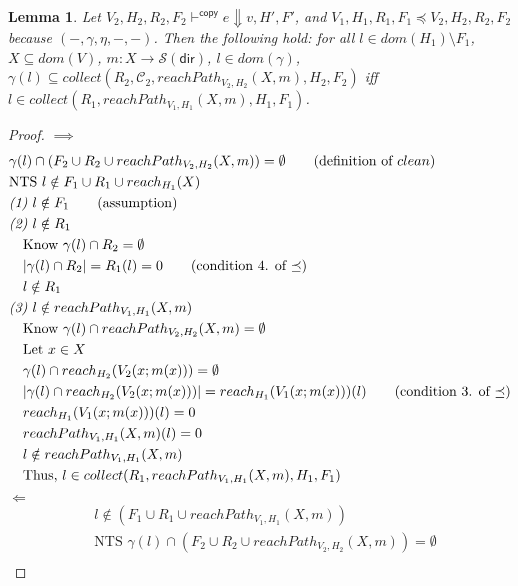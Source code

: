 \documentclass{easychair}
\newcommand{\ms}[1]{\ensuremath{\mathsf{#1}}}
\newtheorem{lemma}[theorem]{Lemma}
\theoremstyle{definition}
\begin{document}
\begin{lemma}
Let $V_2,H_2,R_2,F_2 \vdash^{\mathsf{copy}} e \Downarrow v,H',F'$, and 
$V_1,H_1,R_1,F_1 \preceq V_2,H_2,R_2,F_2$ because $(-,\gamma,\eta,-,-)$. Then the following hold:
for all $l \in dom(H_1) \setminus F_1$, 
	$X \subseteq dom(V)$, $m : X \to \mathcal{S}(\ms{dir})$, $l \in dom(\gamma)$,
	$\gamma(l) \subseteq collect(R_2,\mathcal{C}_2,reachPath_{V_2,H_2}(X,m),H_2,F_2)$ iff
	$l \in collect(R_1,reachPath_{V_1,H_1}(X,m),H_1,F_1)$.
\end{lemma}

\begin{proof}
	$\implies$
	\begin{align*}
		&\gamma(l) \cap (F_2 \cup R_2 \cup reachPath_{V_2,H_2}(X,m)) = 
			\emptyset \tag{definition of $clean$}\\
		&\text{NTS } l \notin F_1 \cup R_1 \cup reach_{H_1}(X)\\
		&\emph{(1) } l \notin F_1 \tag{assumption}\\
		&\emph{(2) } l \notin R_1\\
		&\quad \text{Know } \gamma(l) \cap R_2 = \emptyset\\
		&\quad |\gamma(l) \cap R_2| = R_1(l) = 0 \tag{condition 4. of $\preceq$}\\
		&\quad l \notin R_1\\
		&\emph{(3) } l \notin reachPath_{V_1,H_1}(X,m)\\
		&\quad \text{Know } \gamma(l) \cap reachPath_{V_2,H_2}(X,m) = \emptyset\\
		&\quad \text{Let } x \in X\\
		&\quad \gamma(l) \cap reach_{H_2}(V_2(x;m(x))) = \emptyset\\
		&\quad |\gamma(l) \cap reach_{H_2}(V_2(x;m(x)))| = reach_{H_1}(V_1(x;m(x)))(l) 
			\tag{condition 3. of $\preceq$}\\
		&\quad reach_{H_1}(V_1(x;m(x)))(l) = 0\\
		&\quad reachPath_{V_1,H_1}(X,m)(l) = 0\\
		&\quad l \notin reachPath_{V_1,H_1}(X,m)\\
		&\quad \text{Thus, } l \in collect(R_1,reachPath_{V_1,H_1}(X,m),H_1,F_1)
	\end{align*}
	$\Longleftarrow$
	\begin{align*}
		&l \notin (F_1 \cup R_1 \cup reachPath_{V_1,H_1}(X,m))\\
		&\text{NTS } \gamma(l) \cap (F_2 \cup R_2 \cup reachPath_{V_2,H_2}(X,m)) = \emptyset\\

\end{align*}
\end{proof}
\end{document}
